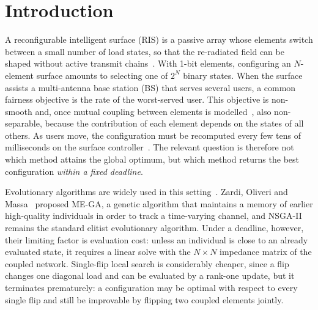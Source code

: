 \documentclass[runningheads]{llncs}
\begin{document}
\section{Introduction}
A reconfigurable intelligent surface (RIS) is a passive array whose elements switch between a small number of load states, so that the re-radiated field can be shaped without active transmit chains~\cite{li2026tutorial}. With 1-bit elements, configuring an $N$-element surface amounts to selecting one of $2^N$ binary states. When the surface assists a multi-antenna base station (BS) that serves several users, a common fairness objective is the rate of the worst-served user. This objective is non-smooth and, once mutual coupling between elements is modelled~\cite{qian2021mutual,zheng2024mutual,nerini2024universal,nerini2026global}, also non-separable, because the contribution of each element depends on the states of all others. As users move, the configuration must be recomputed every few tens of milliseconds on the surface controller~\cite{urbinati2026ondevice}. The relevant question is therefore not which method attains the global optimum, but which method returns the best configuration \emph{within a fixed deadline}.

Evolutionary algorithms are widely used in this setting~\cite{stylianopoulos2022dlga,zardi2024memory}. Zardi, Oliveri and Massa~\cite{zardi2024memory} proposed ME-GA, a genetic algorithm that maintains a memory of earlier high-quality individuals in order to track a time-varying channel, and NSGA-II~\cite{deb2002fast} remains the standard elitist evolutionary algorithm. Under a deadline, however, their limiting factor is evaluation cost: unless an individual is close to an already evaluated state, it requires a linear solve with the $N\times N$ impedance matrix of the coupled network. Single-flip local search is considerably cheaper, since a flip changes one diagonal load and can be evaluated by a rank-one update, but it terminates prematurely: a configuration may be optimal with respect to every single flip and still be improvable by flipping two coupled elements jointly.
\end{document}
